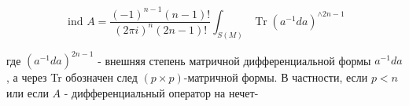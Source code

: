 \documentclass[10pt]{article}
\begin{document}
\[

\text { ind } A=\frac{(-1)^{n-1}(n-1) !}{(2 \pi i)^{n}(2 n-1) !} \int_{S(M)} \operatorname{Tr}\left(a^{-1} d a\right)^{\wedge 2 n-1}

\]



где $\left(a^{-1} d a\right)^{2 n-1}$ - внешняя степень матричной дифференциальной формы $a^{-1} d a$, а через Tr обозначен след $(p \times p)$-матричной формы. В частности, если $p<n$ или если $A$ - дифференциальный оператор на нечет-
\end{document}
